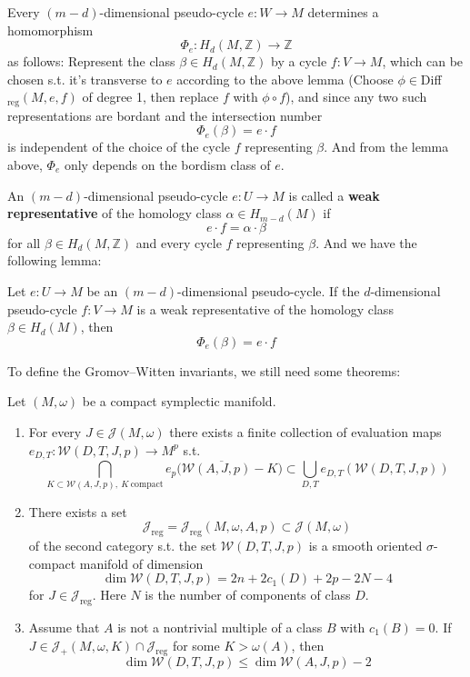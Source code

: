\documentclass[twoside]{article}
\begin{document}
Every $(m-d)$-dimensional pseudo-cycle $e\colon W\rightarrow M$ determines a homomorphism
\[\Phi_e\colon H_d(M,\mathbb{Z})\rightarrow \mathbb{Z}\]
as follows:
Represent the class $\beta\in H_d(M,\mathbb{Z})$ by a cycle $f\colon V\rightarrow M$, 
which can be chosen s.t. it's transverse to $e$ according to the above lemma
(Choose $\phi\in$Diff$_{\textrm{reg}}(M,e,f)$ of degree 1, 
then replace $f$ with $\phi\circ f$), 
and since any two such representations are bordant and the intersection number
\[\Phi_e(\beta)=e\cdot f\]
is independent of the choice of the cycle $f$ representing $\beta$. 
And from the lemma above, $\Phi_e$ only depends on the bordism class of $e$.

An $(m-d)$-dimensional pseudo-cycle $e\colon U\rightarrow M$ 
is called a \textbf{weak representative} of the homology class $\alpha\in H_{m-d}(M)$ if 
\[e\cdot f=\alpha\cdot\beta\]
for all $\beta\in H_d(M,\mathbb{Z})$ and every cycle $f$ representing $\beta$. 
And we have the following lemma:

\begin{lemma}
Let $e\colon U\rightarrow M$ be an $(m-d)$-dimensional pseudo-cycle. 
If the $d$-dimensional pseudo-cycle $f\colon V\rightarrow M$ is 
a weak representative of the homology class $\beta\in H_d(M)$, then 
\[\Phi_e(\beta)=e\cdot f\]
\end{lemma}

To define the Gromov--Witten invariants, we still need some theorems:

\begin{theorem}
Let $(M,\omega)$ be a compact symplectic manifold.
    \begin{enumerate}
        \item For every $J\in\mathscr{J}(M,\omega)$ there exists 
        a finite collection of evaluation maps $e_{D,T}\colon \mathscr{W}(D,T,J,p)\rightarrow M^p$ s.t.
        \[\bigcap_{K\subset \mathscr{W}(A,J,p),\: K\: \textrm{compact}}\overline{e_p(\mathscr{W}(A,J,p)-K})\subset \bigcup_{D,T}e_{D,T}(\mathscr{W}(D,T,J,p))\]
        \item There exists a set 
        \[\mathscr{J}_{\textrm{reg}}=\mathscr{J}_{\textrm{reg}}(M,\omega,A,p)\subset \mathscr{J}(M,\omega)\]
        of the second category s.t. the set $\mathscr{W}(D,T,J,p)$ is a smooth oriented $\sigma$-compact manifold of dimension 
        \[\dim \mathscr{W}(D,T,J,p)=2n+2c_1(D)+2p-2N-4\]
        for $J\in\mathscr{J}_{\textrm{reg}}$. Here $N$ is the number of components of class $D$.
        \item Assume that  $A$ is not a nontrivial multiple of a class 
        $B$ with $c_1(B)=0$. If $J\in\mathscr{J}_+(M,\omega,K)\cap \mathscr{J}_{\textrm{reg}}$ for some $K>\omega(A)$, then
        \[\dim \mathscr{W}(D,T,J,p)\leq \dim\mathscr{W}(A,J,p)-2\]
    \end{enumerate}
\end{theorem}
\end{document}
